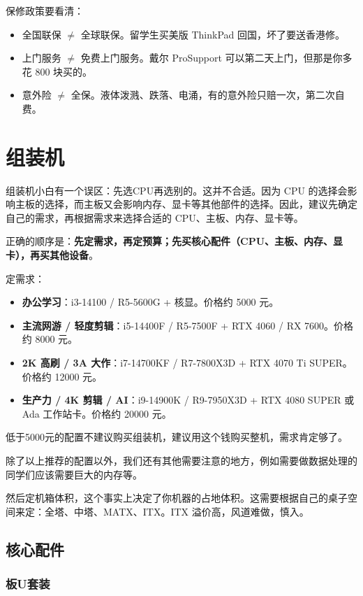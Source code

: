 \documentclass[../main.tex]{subfiles}
\begin{document}
保修政策要看清：
\begin{itemize}
  \item 全国联保 $\neq$ 全球联保。留学生买美版 ThinkPad 回国，坏了要送香港修。
  \item 上门服务 $\neq$ 免费上门服务。戴尔 ProSupport 可以第二天上门，但那是你多花 800 块买的。
  \item 意外险 $\neq$ 全保。液体泼溅、跌落、电涌，有的意外险只赔一次，第二次自费。
\end{itemize}

\section{组装机}

组装机小白有一个误区：先选CPU再选别的。这并不合适。因为 CPU 的选择会影响主板的选择，而主板又会影响内存、显卡等其他部件的选择。因此，建议先确定自己的需求，再根据需求来选择合适的 CPU、主板、内存、显卡等。

正确的顺序是：\textbf{先定需求，再定预算；先买核心配件（CPU、主板、内存、显卡），再买其他设备}。

定需求：
\begin{itemize}
  \item \textbf{办公学习}：i3-14100 / R5-5600G + 核显。价格约 5000 元。
  \item \textbf{主流网游 / 轻度剪辑}：i5-14400F / R5-7500F + RTX 4060 / RX 7600。价格约 8000 元。
  \item \textbf{2K 高刷 / 3A 大作}：i7-14700KF / R7-7800X3D + RTX 4070 Ti SUPER。价格约 12000 元。
  \item \textbf{生产力 / 4K 剪辑 / AI}：i9-14900K / R9-7950X3D + RTX 4080 SUPER 或 Ada 工作站卡。价格约 20000 元。
\end{itemize}

低于5000元的配置不建议购买组装机，建议用这个钱购买整机，需求肯定够了。

除了以上推荐的配置以外，我们还有其他需要注意的地方，例如需要做数据处理的同学们应该需要巨大的内存等。

然后定机箱体积，这个事实上决定了你机器的占地体积。这需要根据自己的桌子空间来定：全塔、中塔、MATX、ITX。ITX 溢价高，风道难做，慎入。

\subsection{核心配件}

\subsubsection{板U套装}
\end{document}
